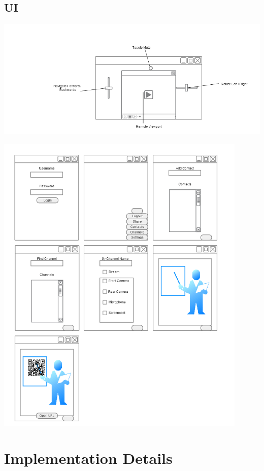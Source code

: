\documentclass[a4paper,12pt]{report}
\begin{document}
\section{UI}

\includegraphics[width=16cm]{MobileGUI_Labeled}

\includegraphics[width=12cm]{MobileUI}

\chapter{Implementation Details}



\end{document}
